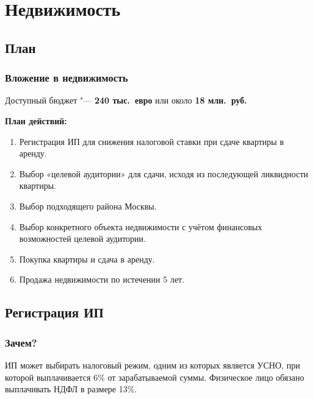 \documentclass{beamer}
\begin{document}
\section{Недвижимость}

	\subsection{План}
	
		\begin{frame}
			\frametitle{Вложение в недвижимость}
			
			Доступный бюджет "--- \textbf{240 тыс.\ евро} или около \textbf{18 млн.\ руб.}
			
			\vspace{\baselineskip}
			\textbf{План действий:}
			\begin{enumerate}
			\item Регистрация ИП для снижения налоговой ставки при сдаче квартиры в аренду.
			\item Выбор «целевой аудитории» для сдачи, исходя из последующей ликвидности квартиры.
			\item Выбор подходящего района Москвы.
			\item Выбор конкретного объекта недвижимости с учётом финансовых возможностей целевой аудитории.
			\item Покупка квартиры и сдача в аренду.
			\item Продажа недвижимости по истечении 5 лет.
			\end{enumerate}
		
		\end{frame}

	\subsection{Регистрация ИП}
	
		\begin{frame}
			\frametitle{Зачем?}
		
			ИП может выбирать налоговый режим, одним из которых является УСНО, при которой выплачивается 6\% от зарабатываемой суммы.
			Физическое лицо обязано выплачивать НДФЛ в размере 13\%.
		
		\end{frame}
\end{document}
